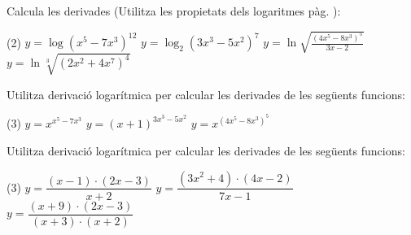 	\begin{mylist}
	
	\exer  Calcula les derivades (Utilitza les propietats dels logaritmes pàg. \pageref{eq:proplog}):
	
	\begin{tasks}(2)
	\task $y = \log (x^5 - 7x^3)^{12}$  \task $y = \log_{2} (3x^3 - 5x^2)^7$  \task $y=\ln \sqrt{\frac{\left(4x^{5} -8x^{3} \right)^{5} }{3x-2} } $   \task  $y=\ln \sqrt[{3}]{\left(2x^{2} +4x^{7} \right)^{4} } $
	\end{tasks}

\answers{[$y'=\dfrac{12}{\ln 10 (x^5-7x^3)}(5x^4-21x^2)$, $y'=\dfrac{7}{\ln 2}\dfrac{9x^2-10x}{3x^3-5x^2}$, $y'=\dfrac{1}{2}\left[ \dfrac{5(20x^4-24x^2)}{4x^5-8x^3} - \dfrac{3}{3x-2} \right]$, $y'=\dfrac{8}{3(x^2+2x^7)}(x+7x^6)$]}
	
	\exer  Utilitza derivació logarítmica per calcular les derivades de les següents funcions:
	\begin{tasks}(3)
		\task $y=x^{x^5-7x^3}$
		\task $y=(x+1)^{3x^3-5x^2}$
		\task $y=x^{(4x^5-8x^3)^5}$
	\end{tasks}
	\answers{[$y'=x^{x^5-7x^3}\cdot \left( (5x^4-21x^2)\ln x + x^4-7x^2 \right)$,  
		     $y'=(x+1)^{3x^3-5x^2}\cdot \left( (9x^2-10x) \ln(x+1) +\frac{3x^3-5x^2}{x+1} \right)$,  
		     $y'=x^{(4x^5-8x^3)^5}\cdot (4x^5-8x^3)^4 \cdot x^2 \cdot \left( 20(5x^2-6)\ln x - 4x^2+8 \right)$]}
	
	\exer Utilitza derivació logarítmica per calcular les derivades de les següents funcions:
		\begin{tasks}(3)
	\task $y=\dfrac{\left(x-1\right)\cdot \left(2x-3\right)}{x+2} $         
	\task $y=\dfrac{\left(3x^{2} +4\right)\cdot \left(4x-2\right)}{7x-1} $  
	\task $y=\dfrac{\left(x+9\right)\cdot \left(2x-3\right)}{\left(x+3\right)\cdot \left(x+2\right)} $
		\end{tasks}
	
	\answers{[$y'=\dfrac{\left(x-1\right)\cdot \left(2x-3\right)}{x+2} \left[ \dfrac{1}{x-1}+\dfrac{2}{2x-3} -\dfrac{1}{x+2}\right]$, 
		   	  $y'=\dfrac{\left(3x^{2} +4\right)\cdot \left(4x-2\right)}{7x-1}\left[ \dfrac{6x}{3x^2+4}+ \dfrac{4}{4x-2} -\dfrac{7}{7x-1} \right]$, 
		      $y'=\dfrac{\left(x+9\right)\cdot \left(2x-3\right)}{\left(x+3\right)\cdot \left(x+2\right)}  \left[ \dfrac{1}{x+9}+\dfrac{2}{2x-3}-\dfrac{1}{x+3}-\dfrac{1}{x+2} \right]$]}
	  
	

\end{mylist}
